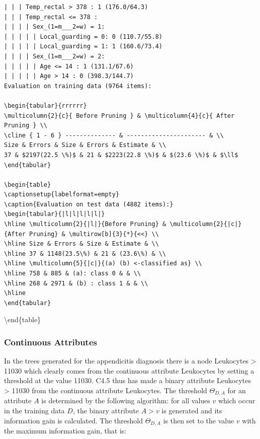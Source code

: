 \documentclass[10pt]{article}
\begin{document}
\begin{verbatim}
| | | Temp_rectal > 378 : 1 (176.0/64.3)
| | | Temp_rectal <= 378 :
| | | | Sex_(1=m___2=w) = 1:
| | | | | Local_guarding = 0: 0 (110.7/55.8)
| | | | | Local_guarding = 1: 1 (160.6/73.4)
| | | | Sex_(1=m___2=w) = 2:
| | | | | Age <= 14 : 1 (131.1/67.6)
| | | | | Age > 14 : 0 (398.3/144.7)
Evaluation on training data (9764 items):

\begin{tabular}{rrrrrr}
\multicolumn{2}{c}{ Before Pruning } & \multicolumn{4}{c}{ After Pruning } \\
\cline { 1 - 6 } -------------- & ---------------------- & \\
Size & Errors & Size & Errors & Estimate & \\
37 & $2197(22.5 \%)$ & 21 & $2223(22.8 \%)$ & $(23.6 \%)$ & $\ll$
\end{tabular}

\begin{table}
\captionsetup{labelformat=empty}
\caption{Evaluation on test data (4882 items):}
\begin{tabular}{|l|l|l|l|l|}
\hline \multicolumn{2}{|l|}{Before Pruning} & \multicolumn{2}{|c|}{After Pruning} & \multirow[b]{3}{*}{<<} \\
\hline Size & Errors & Size & Estimate & \\
\hline 37 & 1148(23.5\%) & 21 & (23.6\%) & \\
\hline \multicolumn{5}{|c|}{(a) (b) <-classified as} \\
\hline 758 & 885 & (a): class 0 & & \\
\hline 268 & 2971 & (b) : class 1 & & \\
\hline
\end{tabular}
\end{verbatim}

\textbackslash end\{table\}

\subsubsection*{Continuous Attributes}
In the trees generated for the appendicitis diagnosis there is a node Leukocytes > 11030 which clearly comes from the continuous attribute Leukocytes by setting a threshold at the value 11030. C4.5 thus has made a binary attribute Leukocytes > 11030 from the continuous attribute Leukocytes. The threshold $\Theta_{D, A}$ for an attribute $A$ is determined by the following algorithm: for all values $v$ which occur in the training data $D$, the binary attribute $A>v$ is generated and its information gain is calculated. The threshold $\Theta_{D, A}$ is then set to the value $v$ with the maximum information gain, that is:
\end{document}
